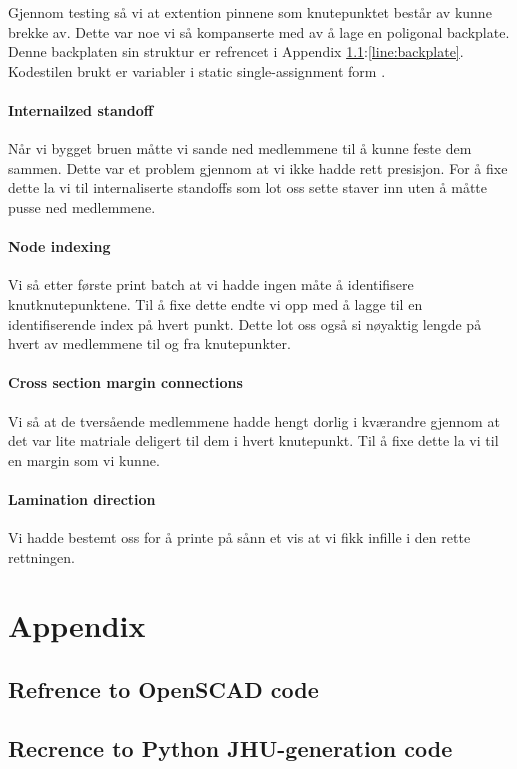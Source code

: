 \documentclass{report}
\begin{document}
Gjennom testing så vi at extention pinnene som knutepunktet består av kunne brekke av. Dette var noe vi så kompanserte med av å lage en poligonal backplate. Denne backplaten sin struktur er refrencet i Appendix \ref{sec:openscad}:\ref{line:backplate}. Kodestilen brukt er variabler i static single-assignment form \cite{wiki:ssaf}.

\subsubsection {Internailzed standoff}

Når vi bygget bruen måtte vi sande ned medlemmene til å kunne feste dem sammen. Dette var et problem gjennom at vi ikke hadde rett presisjon. For å fixe dette la vi til internaliserte standoffs som lot oss sette staver inn uten å måtte pusse ned medlemmene.

\subsubsection {Node indexing}

Vi så etter første print batch at vi hadde ingen måte å identifisere knutknutepunktene. Til å fixe dette endte vi opp med å lagge til en identifiserende index på hvert punkt. Dette lot oss også si nøyaktig lengde på hvert av medlemmene til og fra knutepunkter.

\subsubsection {Cross section margin connections}

Vi så at de tversående medlemmene hadde hengt dorlig i kværandre gjennom at det var lite matriale deligert til dem i hvert knutepunkt. Til å fixe dette la vi til en margin som vi kunne.

\subsubsection {Lamination direction}

Vi hadde bestemt oss for å printe på sånn et vis at vi fikk infille i den rette rettningen.

\chapter{Appendix}

\section{Refrence to OpenSCAD code}
\label{sec:openscad}



\section{Recrence to Python JHU-generation code}
\label{sec:jhu-gen}



\listoffigures


\end{document}
